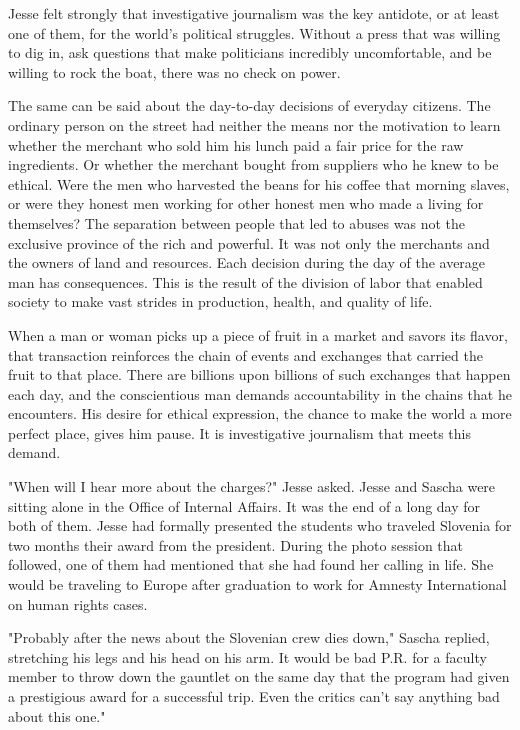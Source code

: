 Jesse felt strongly that investigative journalism was the key antidote, or at least one of them, for the world's political struggles.  Without a press that was willing to dig in, ask questions that make politicians incredibly uncomfortable, and be willing to rock the boat, there was no check on power.  

The same can be said about the day-to-day decisions of everyday citizens.  The ordinary person on the street had neither the means nor the motivation to learn whether the merchant who sold him his lunch paid a fair price for the raw ingredients.  Or whether the merchant bought from suppliers who he knew to be ethical.  Were the men who harvested the beans for his coffee that morning slaves, or were they honest men working for other honest men who made a living for themselves?  The separation between people that led to abuses was not the exclusive province of the rich and powerful.  It was not only the merchants and the owners of land and resources.  Each decision during the day of the average man has consequences.  This is the result of the division of labor that enabled society to make vast strides in production, health, and quality of life.

When a man or woman picks up a piece of fruit in a market and savors its flavor, that transaction reinforces the chain of events and exchanges that carried the fruit to that place.  There are billions upon billions of such exchanges that happen each day, and the conscientious man demands accountability in the chains that he encounters.  His desire for ethical expression, the chance to make the world a more perfect place, gives him pause.  It is investigative journalism that meets this demand.


"When will I hear more about the charges?" Jesse asked.  Jesse and Sascha were sitting alone in the Office of Internal Affairs.  It was the end of a long day for both of them.  Jesse had formally presented the students who traveled Slovenia for two months their award from the president.  During the photo session that followed, one of them had mentioned that she had found her calling in life.  She would be traveling to Europe after graduation to work for Amnesty International on human rights cases.

"Probably after the news about the Slovenian crew dies down," Sascha replied, stretching his legs and his head on his arm.  It would be bad P.R. for a faculty member to throw down the gauntlet on the same day that the program had given a prestigious award for a successful trip.  Even the critics can't say anything bad about this one."

